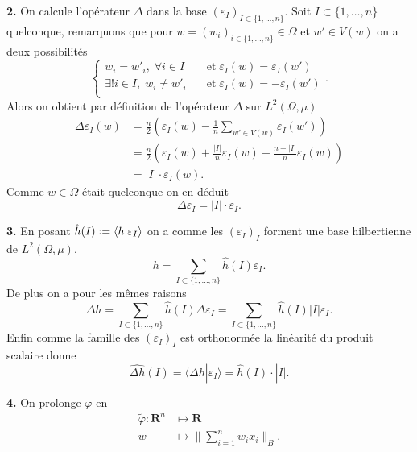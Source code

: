 \documentclass[12pt]{article}
\newcommand{\defeq}{\vcentcolon=}
\newcommand{\R}{\mathbf{R}}
\begin{document}
\medskip

\textbf{2.} On calcule l'opérateur $\Delta$ dans la base $(\varepsilon_{I})_{I \subset \{1, \ldots, n\}}$. Soit $I \subset \{1, \ldots, n\}$ quelconque, remarquons que pour $w = (w_{i})_{i \in \{1, \ldots, n\}} \in \Omega$ et $w' \in V(w)$ on a deux possibilités \[
\begin{cases}
        w_{i} = w'_{i}, \; \forall i \in I \quad &\text{et} \; \varepsilon_{I}(w) = \varepsilon_{I}(w') \\
        \exists! i \in I, \; w_{i} \neq w'_{i} \quad &\text{et} \; \varepsilon_{I}(w) = -\varepsilon_{I}(w') \\
\end{cases}
.\] Alors on obtient par définition de l'opérateur $\Delta$ sur $L^{2}(\Omega, \mu)$
\begin{align*}
        \Delta \varepsilon_{I}(w) &= \frac{n}{2}(\varepsilon_{I}(w) - \frac{1}{n}\sum_{w' \in V(w)}\varepsilon_{I}(w')) \\
                                  &= \frac{n}{2}(\varepsilon_{I}(w) + \frac{|I|}{n}\varepsilon_{I}(w) - \frac{n-|I|}{n}\varepsilon_{I}(w)) \\
                                  &= |I|\cdot\varepsilon_{I}(w)
.\end{align*} Comme $w \in \Omega$ était quelconque on en déduit \[
\Delta \varepsilon_{I} = |I|\cdot\varepsilon_{I}
.\] 

\medskip

\textbf{3.} En posant $\hat{h}(I) \defeq \langle h | \varepsilon_{I} \rangle$ on a comme les $(\varepsilon_{I})_{I}$ forment une base hilbertienne de $L^{2}(\Omega, \mu)$, \[
        h = \sum_{I \subset \{1, \ldots, n\}}\hat{h}(I)\varepsilon_{I}
.\]  De plus on a pour les mêmes raisons \[
\Delta h = \sum_{I \subset \{1, \ldots, n\}}\hat{h}(I)\Delta \varepsilon_{I} = \sum_{I \subset \{1, \ldots, n\}}\hat{h}(I) |I| \varepsilon_{I} 
.\] Enfin comme la famille des $(\varepsilon_{I})_{I}$ est orthonormée la linéarité du produit scalaire donne \[
\hat{\Delta h}(I) = \langle \Delta h | \varepsilon_{I} \rangle = \hat{h}(I)\cdot|I|
.\]  

\bigskip

\textbf{4.} On prolonge $\varphi$ en
 \begin{align*}
         \tilde{\varphi} : \R^{n} &\longmapsto \R \\
         w &\longmapsto \|\sum_{i=1}^{n} w_{i}x_{i}\|_{B}
.\end{align*}
\end{document}
